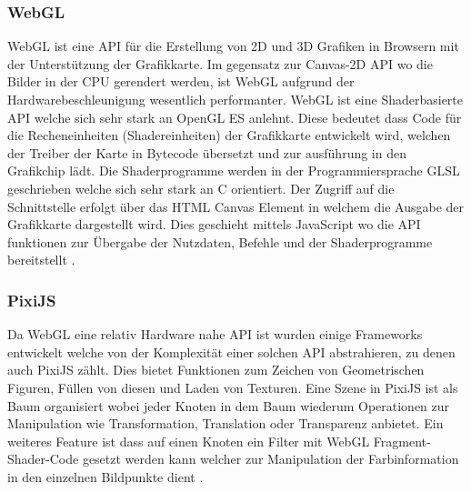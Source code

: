 \subsubsection{WebGL}
\label{sec:WebGL}
WebGL ist eine API für die Erstellung von 2D und 3D Grafiken in Browsern mit der Unterstützung der Grafikkarte.
Im gegensatz zur Canvas-2D API wo die Bilder in der CPU gerendert werden, ist WebGL aufgrund der Hardwarebeschleunigung wesentlich performanter.
WebGL ist eine Shaderbasierte API welche sich sehr stark an OpenGL ES anlehnt.
Diese bedeutet dass Code für die Recheneinheiten (Shadereinheiten) der Grafikkarte entwickelt wird,
welchen der Treiber der Karte in Bytecode übersetzt und zur ausführung in den Grafikchip lädt.
Die Shaderprogramme werden in der Programmiersprache GLSL geschrieben welche sich sehr stark an C orientiert.
Der Zugriff auf die Schnittstelle erfolgt über das HTML Canvas Element in welchem die Ausgabe der Grafikkarte dargestellt wird.
Dies geschieht mittels JavaScript wo die API funktionen zur Übergabe der Nutzdaten, Befehle und der Shaderprogramme bereitstellt \cite{webgl-14}.

\subsubsection{PixiJS}
\label{sec:PixiJS}
Da WebGL eine relativ Hardware nahe API ist wurden einige Frameworks entwickelt welche von der Komplexität einer solchen API abstrahieren, zu denen auch PixiJS zählt.
Dies bietet Funktionen zum Zeichen von Geometrischen Figuren, Füllen von diesen und Laden von Texturen.
Eine Szene in PixiJS ist als Baum organisiert wobei jeder Knoten in dem Baum wiederum Operationen zur Manipulation wie Transformation, Translation oder Transparenz anbietet.
Ein weiteres Feature ist dass auf einen Knoten ein Filter mit WebGL Fragment-Shader-Code gesetzt werden kann welcher zur Manipulation der Farbinformation in den einzelnen Bildpunkte dient \cite{pixijs}.


